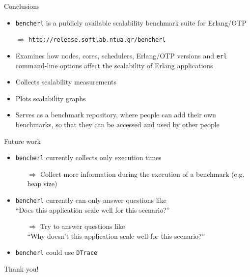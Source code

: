 \documentclass{beamer}
\begin{document}
\begin{frame}[t]{Conclusions}
	\begin{itemize}
		\item \texttt{bencherl} is a publicly available \textcolor{burgundy}{scalability} benchmark suite for Erlang/OTP
                  \par\medskip
		  $\Rightarrow$ \texttt{http://release.softlab.ntua.gr/bencherl}
                  \par\medskip
		\item Examines how \textcolor{burgundy}{nodes}, \textcolor{burgundy}{cores}, \textcolor{burgundy}{schedulers}, \textcolor{burgundy}{Erlang/OTP versions} and \textcolor{burgundy}{\texttt{erl} command-line options} affect the scalability of Erlang applications
		\item Collects \textcolor{burgundy}{scalability measurements}
		\item Plots \textcolor{burgundy}{scalability graphs}
		\item Serves as a \textcolor{burgundy}{benchmark repository}, where people can add their own benchmarks, so that they can be accessed and used by other people
	\end{itemize}
\end{frame}

\begin{frame}[t]{Future work}
  \begin{itemize}
  \item \texttt{bencherl} currently collects only execution times
    \begin{itemize}
    \item[$\Rightarrow$] Collect \textcolor{burgundy}{more information} during the execution of a benchmark (e.g. heap size)
    \end{itemize}
  \item \texttt{bencherl} currently can only answer questions like \\
    ``Does this application scale well for this scenario?''
    \begin{itemize}
    \item[$\Rightarrow$] Try to answer questions like \\
      ``\textcolor{burgundy}{Why} doesn't this application scale well for this scenario?''
    \end{itemize}
  \item \texttt{bencherl} could use \textcolor{burgundy}{\texttt{DTrace}}
  \end{itemize}
\end{frame}

\begin{frame}
	\vspace{50pt}
	\begin{center}
	Thank you!
	\end{center}
\end{frame}
\end{document}

